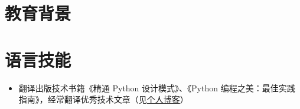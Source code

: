\documentclass[12pt,a4paper,sans]{moderncv}   %
\begin{document}
\begin{CJK}{UTF8}{gkai}
\section{教育背景}


\section{语言技能}

\begin{itemize}
\item 翻译出版技术书籍《精通 Python 设计模式》、《Python 编程之美：最佳实践指南》，经常翻译优秀技术文章（见{\color{blue}\href{http://blog.xiayf.cn}{个人博客}}）
\end{itemize}

\clearpage\end{CJK}
\end{document}

